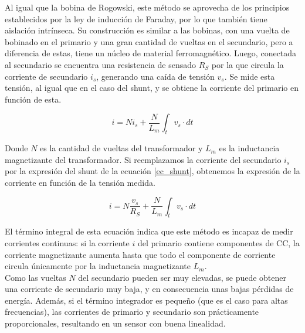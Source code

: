 Al igual que la bobina de Rogowski, este método se aprovecha de los principios establecidos por la ley de inducción de Faraday, por lo que también tiene {\Medium aislación intrínseca}. Su construcción es similar a las bobinas, con una vuelta de bobinado en el primario y una gran cantidad de vueltas en el secundario, pero a diferencia de estas, tiene un núcleo de material ferromagnético. Luego, conectada al secundario se encuentra una resistencia de sensado $R_S$ por la que circula la corriente de secundario $i_s$, generando una caída de tensión $v_s$. Se mide esta tensión, al igual que en el caso del shunt, y se obtiene la corriente del primario en función de esta.

\begin{equation*}
    i = Ni_s + \frac{N}{L_m}\int_t v_s\cdot dt
\end{equation*}

Donde $N$ es la cantidad de vueltas del transformador y $L_m$ es la inductancia magnetizante del transformador. Si reemplazamos la corriente del secundario $i_s$ por la expresión del shunt de la ecuación \ref{ec_shunt}, obtenemos la expresión de la corriente en función de la tensión medida.

\begin{equation}\label{ec_trafocorriente}
    i = N\frac{v_s}{R_S} + \frac{N}{L_m}\int_t v_s\cdot dt
\end{equation}

El término integral de esta ecuación indica que este método es {\Medium incapaz de medir corrientes continuas}: si la corriente $i$ del primario contiene componentes de CC, la corriente magnetizante aumenta hasta que todo el componente de corriente circula únicamente por la inductancia magnetizante $L_m$.\\

Como las vueltas $N$ del secundario pueden ser muy elevadas, se puede obtener una corriente de secundario muy baja, y en consecuencia unas {\Medium bajas pérdidas de energía}. Además, si el término integrador es pequeño (que es el caso para altas frecuencias), las corrientes de primario y secundario son prácticamente proporcionales, resultando en un sensor con {\Medium buena linealidad}.\\


